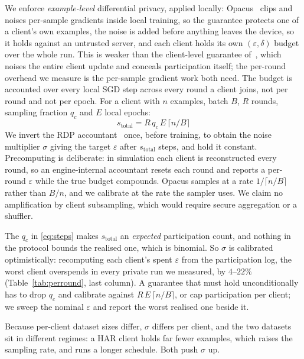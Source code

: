 We enforce \emph{example-level} differential privacy, applied locally:
Opacus~\cite{yousefpour2021opacus} clips and noises per-sample gradients
inside local training, so the guarantee protects one of a client's own
examples, the noise is added before anything leaves the device, so it holds
against an untrusted server, and each client holds its own $(\varepsilon,
\delta)$ budget over the whole run. This is weaker than the client-level
guarantee of~\cite{geyer2017differentially, wei2020federated}, which noises
the entire client update and conceals participation itself; the per-round
overhead we measure is the per-sample gradient work both need. The budget is
accounted over every local SGD step across every round a client joins, not per
round and not per epoch. For a client with $n$ examples, batch $B$, $R$
rounds, sampling fraction $q_c$ and $E$ local epochs:
%
\begin{equation}\label{eq:steps}
  s_{\text{total}} = R \, q_c \, E \, \lceil n / B \rceil
\end{equation}
%
We invert the RDP accountant~\cite{mironov2017renyi} once, before training, to obtain the
noise multiplier $\sigma$ giving the target $\varepsilon$ after
$s_{\text{total}}$ steps, and hold it constant. Precomputing is deliberate: in
simulation each client is reconstructed every round, so an engine-internal
accountant resets each round and reports a per-round $\varepsilon$ while the
true budget compounds. Opacus samples at a rate $1/\lceil n/B \rceil$ rather
than $B/n$, and we calibrate at the rate the sampler uses. We claim no
amplification by client subsampling, which would require secure aggregation or
a shuffler.

The $q_c$ in \eqref{eq:steps} makes $s_{\text{total}}$ an \emph{expected}
participation count, and nothing in the protocol bounds the realised one,
which is binomial. So $\sigma$ is calibrated optimistically: recomputing each
client's spent $\varepsilon$ from the participation log, the worst client
overspends in every private run we measured, by $4$--$22\%$
(Table~\ref{tab:perround}, last column). A guarantee that must hold
unconditionally has to drop $q_c$ and calibrate against $R \, E \, \lceil n/B
\rceil$, or cap participation per client; we sweep the nominal
$\varepsilon$ and report the worst realised one beside it.

Because per-client dataset sizes differ, $\sigma$ differs per client, and the
two datasets sit in different regimes: a HAR client holds far fewer examples,
which raises the sampling rate, and runs a longer schedule. Both push $\sigma$ up.

